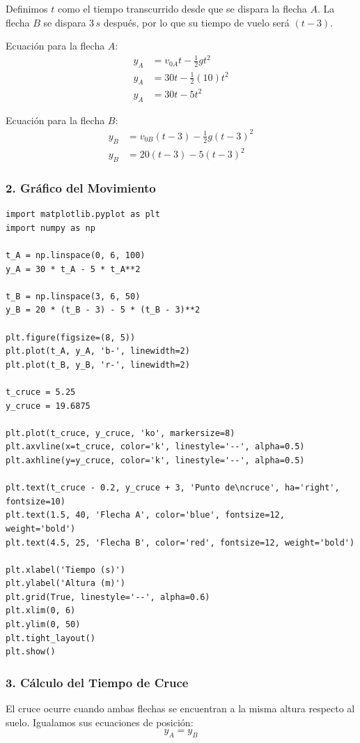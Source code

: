 \documentclass[12pt, a4paper]{article}
\begin{document}
Definimos $t$ como el tiempo transcurrido desde que se dispara la flecha $A$. La flecha $B$ se dispara $3 \, \si{s}$ después, por lo que su tiempo de vuelo será $(t - 3)$.

Ecuación para la flecha $A$:
\begin{align*}
y_A &= v_{0A}t - \frac{1}{2}gt^2 \\
y_A &= 30t - \frac{1}{2}(10)t^2 \\
y_A &= 30t - 5t^2
\end{align*}

Ecuación para la flecha $B$:
\begin{align*}
y_B &= v_{0B}(t - 3) - \frac{1}{2}g(t - 3)^2 \\
y_B &= 20(t - 3) - 5(t - 3)^2
\end{align*}

\subsubsection*{2. Gráfico del Movimiento}
\begin{lstlisting}
import matplotlib.pyplot as plt
import numpy as np

t_A = np.linspace(0, 6, 100)
y_A = 30 * t_A - 5 * t_A**2

t_B = np.linspace(3, 6, 50)
y_B = 20 * (t_B - 3) - 5 * (t_B - 3)**2

plt.figure(figsize=(8, 5))
plt.plot(t_A, y_A, 'b-', linewidth=2)
plt.plot(t_B, y_B, 'r-', linewidth=2)

t_cruce = 5.25
y_cruce = 19.6875

plt.plot(t_cruce, y_cruce, 'ko', markersize=8)
plt.axvline(x=t_cruce, color='k', linestyle='--', alpha=0.5)
plt.axhline(y=y_cruce, color='k', linestyle='--', alpha=0.5)

plt.text(t_cruce - 0.2, y_cruce + 3, 'Punto de\ncruce', ha='right', fontsize=10)
plt.text(1.5, 40, 'Flecha A', color='blue', fontsize=12, weight='bold')
plt.text(4.5, 25, 'Flecha B', color='red', fontsize=12, weight='bold')

plt.xlabel('Tiempo (s)')
plt.ylabel('Altura (m)')
plt.grid(True, linestyle='--', alpha=0.6)
plt.xlim(0, 6)
plt.ylim(0, 50)
plt.tight_layout()
plt.show()
\end{lstlisting}

\subsubsection*{3. Cálculo del Tiempo de Cruce}
El cruce ocurre cuando ambas flechas se encuentran a la misma altura respecto al suelo. Igualamos sus ecuaciones de posición:
$$ y_A = y_B $$
\end{document}
